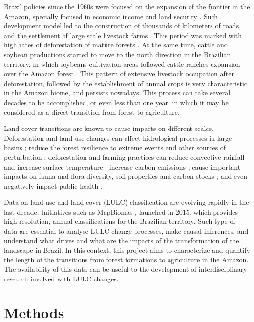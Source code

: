 \documentclass[essd, manuscript]{copernicus}
\begin{document}
Brazil policies since the 1960s were focused on the expansion of the frontier in the Amazon, specially focused in economic income and land security \citep{Carvalho2002, Mcdonald2003, Banerjee2009}. Such development model led to the construction of thousands of kilometers of roads, and the settlement of large scale livestock farms \citep{Carvalho2002, Banerjee2009}. This period was marked with high rates of deforestation of mature forests \citep{Fearnside2005}. At the same time, cattle and soybean productions started to move to the north direction in the Brazilian territory, in which soybeans cultivation areas followed cattle ranches expansion over the Amazon forest \citep{Simon2005, Barona2010, Arima2011}.
This pattern of extensive livestock occupation after deforestation, followed by the establishment of annual crops is very characteristic in the Amazon biome, and persists nowadays.
This process can take several decades to be accomplished, or even less than one year, in which it may be considered as a direct transition from forest to agriculture.

Land cover transitions are known to cause impacts on different scales.
Deforestation and land use changes can affect hidrological processes in large basins \citep{Arias2018}; reduce the forest resilience to extreme events and other sources of perturbation \citep{Boulton2022}; deforestation and farming practices can reduce convective rainfall and increase surface temperature \citep{Maeda2021}; increase carbon emissions \citep{Gatti2021}; cause important impacts on fauna and flora diversity, soil properties and carbon stocks \citep{Nunes2022}; and even negatively impact public health \citep{Ellwanger2020}.

Data on land use and land cover (LULC) classification are evolving rapidly in the last decade.
Initiatives such as MapBiomas \citep{Souza2020}, launched in 2015, which provides high resolution, annual classifications for the Brazilian territory.
Such type of data are essential to analyse LULC change processes, make causal inferences, and understand what drives and what are the impacts of the transformation of the landscape in Brazil.
In this context, this project aims to characterize and quantify the length of the transitions from forest formations to agriculture in the Amazon.
The availability of this data can be useful to the development of interdisciplinary research involved with LULC changes.

\section{Methods}
\end{document}
